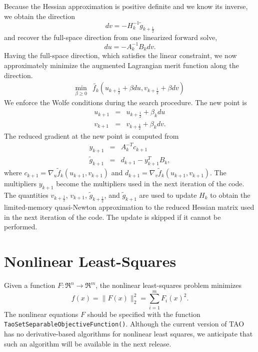 Because the Hessian approximation is positive definite and we know its
inverse, we obtain the direction
\[
  dv = -H_k^{-1} \tilde{g}_{k+\frac{1}{2}}
\]
and recover the full-space direction from one linearized forward solve,
\[
  du = -A_k^{-1} B_k dv.
\]
Having the full-space direction, which satisfies the linear constraint, 
we now approximately minimize the augmented Lagrangian merit function 
along the direction.
\[
\begin{array}{lcl}
\displaystyle \min_{\beta \geq 0} & \tilde{f_k}(u_{k+\frac{1}{2}} + \beta du, v_{k+\frac{1}{2}} + \beta dv)
\end{array}
\]
We enforce the Wolfe conditions during the search procedure.  The new point
is
\[
\begin{array}{lcl}
u_{k+1} & = & u_{k+\frac{1}{2}} + \beta_k du \\
v_{k+1} & = & v_{k+\frac{1}{2}} + \beta_k dv.
\end{array}
\]
The reduced gradient at the new point is computed from
\[
\begin{array}{lcl}
y_{k+1} & = & A_k^{-T}c_{k+1} \\
\tilde{g}_{k+1} & = & d_{k+1} - y_{k+1}^T B_k,
\end{array}
\]
where $c_{k+1} = \nabla_u \tilde{f}_k (u_{k+1},v_{k+1})$ and
$d_{k+1} = \nabla_v \tilde{f}_k (u_{k+1},v_{k+1})$.  The
multipliers $y_{k+1}$ become the multipliers used in the
next iteration of the code.  The quantities $v_{k+\frac{1}{2}}$,
$v_{k+1}$, $\tilde{g}_{k+\frac{1}{2}}$, and $\tilde{g}_{k+1}$ are
used to update $H_k$ to obtain the limited-memory quasi-Newton
approximation to the reduced Hessian matrix used in the next
iteration of the code.  The update is skipped if it cannot be
performed.

\section{Nonlinear Least-Squares}
\label{sec:leastsquares}
Given a function $F: \Re^n \to \Re^m$, the nonlinear least-squares 
problem minimizes 
\begin{equation} 
 f(x)= \| F(x) \|_2^2 = \sum_{i=1}^m F_i(x)^2.
 \label{eq:nlsf}
\end{equation}
The nonlinear equations $F$ should be specified with the function
{\tt Tao\-Set\-Separ\-able\-Objective\-Function()}.
Although the current version of TAO has no derivative-based algorithms 
for nonlinear least squares, we anticipate that such an algorithm will 
be available in the next release. 

